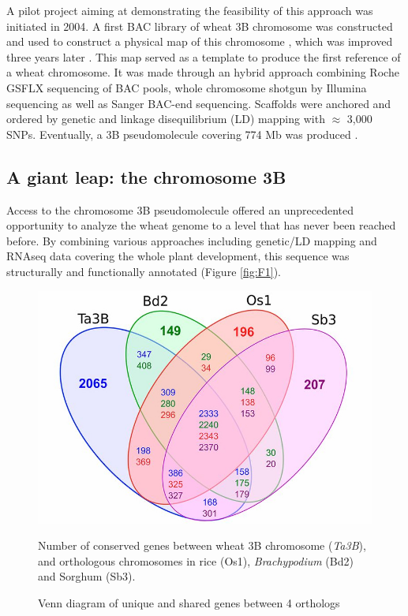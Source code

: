 \documentclass[a4paper, 12pt]{article}
\begin{document}
\begin{onehalfspace}
A pilot project aiming at demonstrating the feasibility of this approach was initiated in 2004. A first BAC library of wheat 3B chromosome was constructed \citep{Safar2004} and used to construct a physical map of this chromosome \citep{Paux2008}, which was improved three years later \citep{Rustenholz2011}. This map served as a template to produce the first reference of a wheat chromosome. It was made through an hybrid approach combining Roche GSFLX sequencing of BAC pools, whole chromosome shotgun by Illumina sequencing as well as Sanger BAC-end sequencing. Scaffolds were anchored and ordered by genetic and linkage disequilibrium (LD) mapping with $\approx$ 3,000 SNPs. Eventually, a 3B pseudomolecule covering 774 Mb was produced \citep{Choulet2k14}.

        \subsection{A giant leap: the chromosome 3B}
            
Access to the chromosome 3B pseudomolecule offered an unprecedented opportunity to analyze the wheat genome to a level that has never been reached before. By combining various approaches including genetic/LD mapping and RNAseq data covering the whole plant development, this sequence was structurally and functionally annotated (Figure \ref{fig:F1}).

\newpage %
\thispagestyle{empty}
    \begin{figure}
      \centering \includegraphics[scale=0.6]{Figures/Figure_2.jpg}
      \vspace{0.5cm}
      \caption{Venn diagram of unique and shared genes between 4 orthologs} 
      \label{fig:F2}
    \footnotesize{Number of conserved genes between wheat 3B chromosome (\textit{Ta3B}), and orthologous chromosomes in rice (Os1), \textit{Brachypodium} (Bd2) and Sorghum (Sb3). 
    
}
\end{figure}
\end{onehalfspace}
\end{document}
